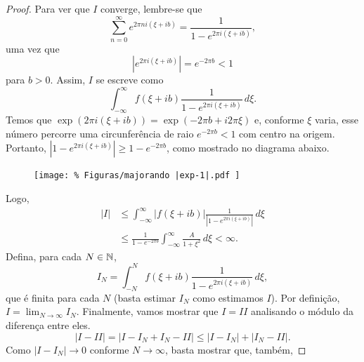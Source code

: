 \begin{proof}
        Para ver que $I$ converge, lembre-se que
        \begin{equation*}
            \sum_{n=0}^{\infty} e^{2\pi n i(\xi + ib)} = \frac{1}{1 - e^{2\pi i(\xi + ib)}},
        \end{equation*}
        uma vez que
        \begin{equation*}
            |e^{2\pi i(\xi + ib)}| = e^{-2\pi b} < 1
        \end{equation*}
        para $b > 0$. Assim, $I$ se escreve como
        \begin{equation*}
            \int_{-\infty}^{\infty} f(\xi + ib)\frac{1}{1 - e^{2\pi i(\xi + ib)}}\,d\xi.
        \end{equation*}
        Temos que $\exp(2\pi i (\xi + ib)) = \exp(-2\pi b + i2\pi \xi)$ e, 
        conforme $\xi$ varia, esse número percorre uma circunferência de raio 
        $e^{-2\pi b} < 1$ com centro na origem. Portanto, 
        $|1 - e^{2\pi i(\xi + ib)}| \geq 1 - e^{-2\pi b}$, como mostrado no 
        diagrama abaixo.
        \begin{figure}[H]\centering
            \texttt{[image: \%
                Figuras/majorando |exp-1|.pdf
            ]}
        \end{figure}
        Logo,
        \begin{align*}
            |I| &\leq \int_{-\infty}^{\infty}|f(\xi + ib)|\frac{1}{|1 - e^{2\pi i(\xi + ib)}|} \, d\xi \\
            &\leq \frac{1}{1 - e^{-2\pi b}}\int_{-\infty}^{\infty} \frac{A}{1 + \xi^2} \, d\xi < \infty.
        \end{align*}
        Defina, para cada $N\in \mathbb{N}$,
        \begin{equation*}
            I_N = \int_{-N}^{N}f(\xi + ib)\frac{1}{1 - e^{2\pi i(\xi + ib)}} \, d\xi,
        \end{equation*}
        que é finita para cada $N$ (basta estimar $I_N$ como estimamos $I$).
        Por definição, $I = \displaystyle{\lim_{N\to\infty} I_N}$. 
        Finalmente, vamos mostrar que $I = \mathit{II}$ 
        analisando o módulo da diferença entre eles.
        \begin{equation*}
            |I - \mathit{II}|  = |I - I_N + I_N - \mathit{II}| 
                               \leq |I-I_N| + |I_N - \mathit{II}|.
        \end{equation*}
        Como $|I - I_N| \to 0$ conforme $N \to \infty$, basta mostrar que, também, 

\end{proof}
